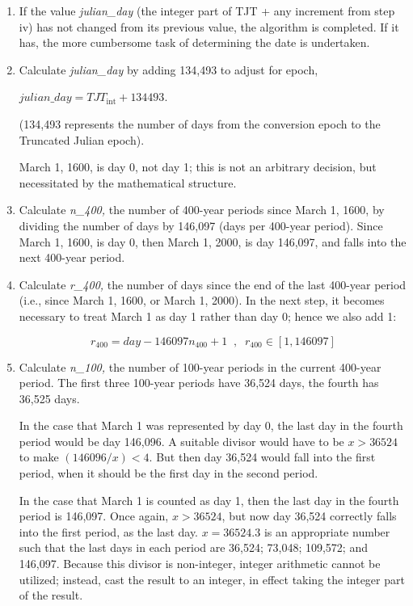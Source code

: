 {\begin{enumerate}
{\begin{enumerate}
\begin{enumerate}
\begin{equation*}
{hour}=\frac{{min}_{\text{int}}}{60},
\end{equation*}
\begin{equation*}
{minute}={min}_{\text{int}}-60\cdot {hour}.
\end{equation*}
 

\item If the value \textit{julian\_day }(the integer part of TJT + any
increment from step iv) has not changed from its previous value, the
algorithm is completed.  If it has, the more cumbersome task of
determining the date is undertaken.
\item Calculate \textit{julian\_day }by adding 134,493 to adjust for
epoch, 

${julian}\text{\_}{day}={TJT}_{\text{int}}+134493$.

(134,493 represents the number of days from the conversion epoch to the 
Truncated
Julian epoch).  

March 1, 1600, is day 0, not day 1; this is not an
arbitrary decision, but necessitated by the mathematical structure.
\item Calculate \textit{n\_400,} the number of 400-year periods since
March 1, 1600, by dividing the number of days by 146,097 (days per
400-year period).  Since March 1, 1600, is day 0, then March 1, 2000, is
day 146,097, and falls into the next 400-year period.
\item  Calculate \textit{r\_400, }the number of days since the end of the last
400-year period (i.e., since March 1, 1600, or March 1, 2000).  In the next
step, it becomes necessary to treat March 1 as day 1 rather than day 0;
hence we also add 1:


\begin{equation*}
r_{400}={day}-146097n_{400}+1 \; \; , \; \; r_{400}\in [1,146097]
\end{equation*}


\item Calculate \textit{n\_100, }the number of 100-year periods in the
current 400-year period.  The first three 100-year periods have 36,524 days,
the fourth has 36,525 days.  

In the case that March 1 was represented by day
0, the last day in the fourth period would be day
146,096.  A suitable divisor would have to be $x>36524$ to make 
$(146096/x)<4$.  But then day 36,524 would fall into the first period,
when it should be the first day in the second period.  

In the case that
March 1 is counted as day 1, then the last day in the
fourth period is 146,097.  Once again,  $x>36524$, but
now day 36,524 correctly falls into the first period, as the last day.  
$x=36524.3$ is an appropriate number such that the last days in each
period are 36,524; 73,048; 109,572; and 146,097.  Because this divisor is
non-integer, integer arithmetic cannot be utilized; instead, cast the
result to an integer, in effect taking the integer part of the result.


\end{enumerate}
\end{enumerate}}
\end{enumerate}}
